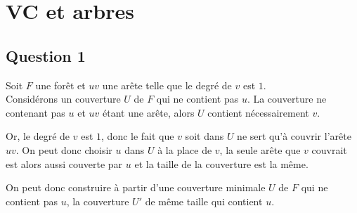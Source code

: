  \section{VC et arbres}
 
  \subsection{Question 1\label{part1q1}}
  Soit $F$ une forêt et $uv$ une arête telle que le degré de $v$ est
  $1$.\\

  Considérons un couverture $U$ de $F$ qui ne contient pas $u$. La
  couverture ne contenant pas $u$ et $uv$ étant une arête, alors $U$
  contient nécessairement $v$.

  Or, le degré de $v$ est $1$, donc le fait que $v$ soit dans $U$ ne
  sert qu'à couvrir l'arête $uv$. On peut donc choisir $u$ dans $U$ à la
  place de $v$, la seule arête que $v$ couvrait est alors aussi couverte
  par $u$ et la taille de la couverture est la même.
  
  On peut donc construire à partir d'une couverture minimale $U$ de $F$
  qui ne contient pas $u$, la couverture $U'$ de même taille qui
  contient $u$.

  